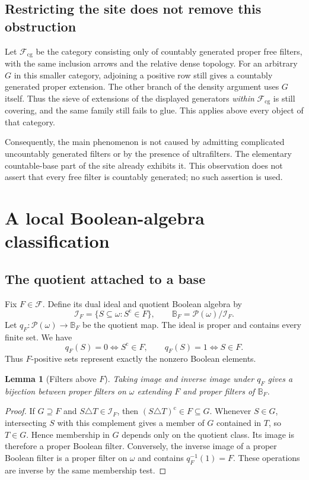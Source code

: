 \documentclass[11pt,letterpaper]{article}
\newtheorem{lemma}[theorem]{Lemma}
\theoremstyle{definition}
\theoremstyle{remark}
\newcommand{\om}{\omega}
\newcommand{\cF}{\mathcal F}
\newcommand{\Pow}{\mathcal P}
\newcommand{\co}{\mathrm c}
\newcommand{\B}{\mathbb B}
\newcommand{\I}{\mathcal I}
\begin{document}
\subsection{Restricting the site does not remove this obstruction}
Let $\cF_{\mathrm{cg}}$ be the category consisting only of countably
generated proper free filters, with the same inclusion arrows and the
relative dense topology. For an arbitrary $G$ in this smaller category,
adjoining a positive row still gives a countably generated proper
extension. The other branch of the density argument uses $G$ itself.
Thus the sieve of extensions of the displayed generators \emph{within}
$\cF_{\mathrm{cg}}$ is still covering, and the same family still fails
to glue. This applies above every object of that category.

Consequently, the main phenomenon is not caused by admitting complicated
uncountably generated filters or by the presence of ultrafilters.
The elementary countable-base part of the site already exhibits it.
This observation does not assert that every free filter is countably
generated; no such assertion is used.

\section{A local Boolean-algebra classification}
\label{sec:boolean}

\subsection{The quotient attached to a base}
Fix $F\in\cF$. Define its dual ideal and quotient Boolean algebra by
\begin{equation}\label{eq:BF}
 \I_F=\{S\subseteq\om:S^\co\in F\},\qquad
 \B_F=\Pow(\om)/\I_F.
\end{equation}
Let $q_F:\Pow(\om)\to\B_F$ be the quotient map. The ideal is proper
and contains every finite set. We have
\begin{equation}\label{eq:quotient-tests}
 q_F(S)=0\Longleftrightarrow S^\co\in F,
 \qquad
 q_F(S)=1\Longleftrightarrow S\in F.
\end{equation}
Thus $F$-positive sets represent exactly the nonzero Boolean elements.

\begin{lemma}[Filters above $F$]\label{lem:filter-correspondence}
Taking image and inverse image under $q_F$ gives a bijection between
proper filters on $\om$ extending $F$ and proper filters of $\B_F$.
\end{lemma}
\begin{proof}
If $G\supseteq F$ and $S\triangle T\in\I_F$, then
$(S\triangle T)^\co\in F\subseteq G$. Whenever $S\in G$,
intersecting $S$ with this complement gives a member of $G$ contained
in $T$, so $T\in G$. Hence membership in $G$ depends only on the
quotient class. Its image is therefore a proper Boolean filter.
Conversely, the inverse image of a proper Boolean filter is a proper
filter on $\om$ and contains $q_F^{-1}(1)=F$. These operations
are inverse by the same membership test.
\end{proof}
\end{document}
